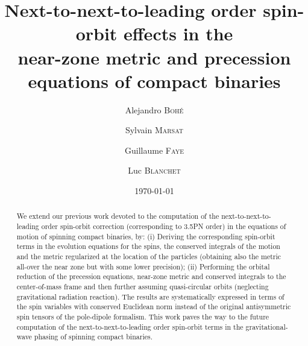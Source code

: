 \documentclass[
superscriptaddress,
preprint,
prd,tightenlines,showpacs,nofootinbib,
eqsecnum,
amsfonts,amsmath,amssymb]{revtex4-1}
\begin{document}
\title{Next-to-next-to-leading order spin-orbit effects in the \\near-zone
  metric and precession equations of compact binaries}

\author{Alejandro \textsc{Boh\'{e}}}

\author{Sylvain \textsc{Marsat}}

\author{Guillaume \textsc{Faye}}

\author{Luc \textsc{Blanchet}}

\date{\today}

\begin{abstract}
  We extend our previous work devoted to the computation of the
  next-to-next-to-leading order spin-orbit correction (corresponding
  to 3.5PN order) in the equations of motion of spinning compact
  binaries, by: (i) Deriving the corresponding spin-orbit terms in the
  evolution equations for the spins, the conserved integrals of the
  motion and the metric regularized at the location of the particles
  (obtaining also the metric all-over the near zone but with some
    lower precision); (ii) Performing the orbital reduction of the
  precession equations, near-zone metric and conserved integrals to
  the center-of-mass frame and then further assuming quasi-circular
  orbits (neglecting gravitational radiation reaction). The results
  are systematically expressed in terms of the spin variables with
  conserved Euclidean norm instead of the original antisymmetric spin
  tensors of the pole-dipole formalism. This work paves the way to the
  future computation of the next-to-next-to-leading order spin-orbit
  terms in the gravitational-wave phasing of spinning compact
  binaries.
\end{abstract}
\end{document}
